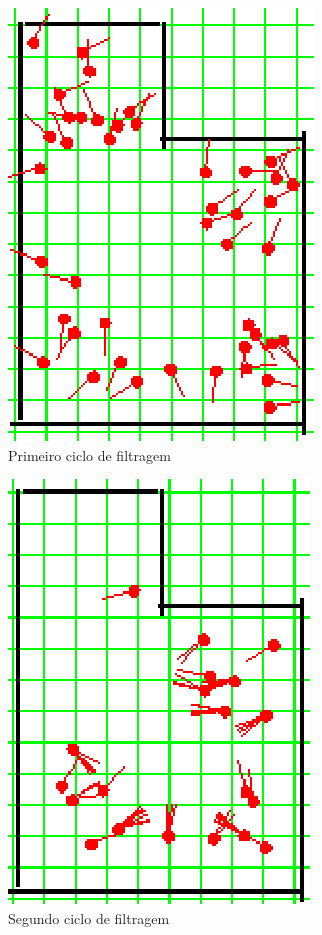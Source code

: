 \begin{figure}[H]
  \centering
  \includegraphics[scale=1]{figuras/cen1_ex1/2.eps}
  \caption[Primeiro Ciclo de Filtragem]{Primeiro ciclo de filtragem}
  \label{img:cen1_ex1_2}
\end{figure}

\begin{figure}[H]
  \centering
  \includegraphics[scale=1]{figuras/cen1_ex1/3.eps}
  \caption[Segundo Ciclo de Filtragem]{Segundo ciclo de filtragem}
  \label{img:cen1_ex1_3}
\end{figure}

